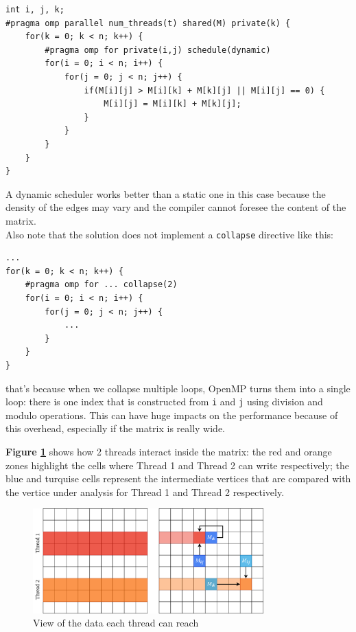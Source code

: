 \begin{lstlisting}[style=CStyle]
int i, j, k;
#pragma omp parallel num_threads(t) shared(M) private(k) {
	for(k = 0; k < n; k++) {
		#pragma omp for private(i,j) schedule(dynamic)			
		for(i = 0; i < n; i++) {
			for(j = 0; j < n; j++) {
				if(M[i][j] > M[i][k] + M[k][j] || M[i][j] == 0) {
					M[i][j] = M[i][k] + M[k][j];
				}
			}
		}
	}
}
\end{lstlisting}

A dynamic scheduler works better than a static one in this case because the
density of the edges may vary and the compiler cannot foresee the content of the matrix. \\
Also note that the solution does not implement a \texttt{collapse} directive like this:
\begin{lstlisting}[style=CStyle]
...
for(k = 0; k < n; k++) {
	#pragma omp for ... collapse(2)			
	for(i = 0; i < n; i++) {
		for(j = 0; j < n; j++) {
			...
		}
	}
}
\end{lstlisting}
that's because when we collapse multiple loops, OpenMP turns them into a single loop: there is one
index that is constructed from \texttt{i} and \texttt{j} using division and modulo operations. This can
have huge impacts on the performance because of this overhead, especially if the matrix is really wide.

\textbf{Figure \ref*{fig:threads}} shows how 2 threads interact inside the matrix: the red and orange zones highlight the cells where
Thread 1 and Thread 2 can write respectively; the blue and turquise cells represent the intermediate vertices that are compared
with the vertice under analysis for Thread 1 and Thread 2 respectively.

\begin{figure}[h!]
\centering                                                                        
\includegraphics[width=3.5in]{diagrams/openmp-threads}
\captionsetup{justification=centering,margin=2cm}                                                                                                                                   
\caption{View of the data each thread can reach}                                                                                                                                            
\label{fig:threads}                                                                                                                                                           
\end{figure}

